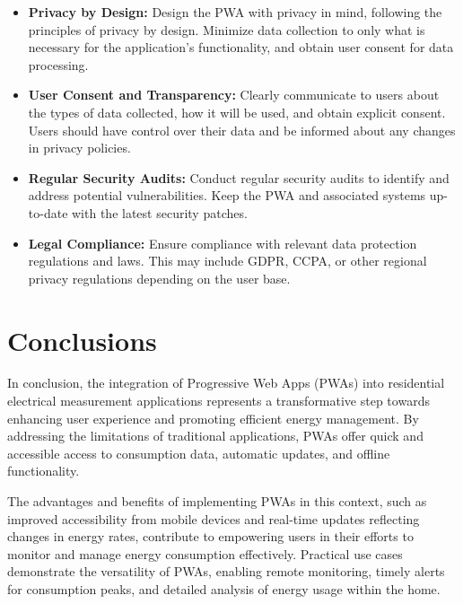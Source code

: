 \documentclass{article}
\begin{document}
\begin{multicols}{2}
\begin{itemize}
    \item \textbf{Privacy by Design:} Design the PWA with privacy in mind, following the principles of privacy by design. Minimize data collection to only what is necessary for the application's functionality, and obtain user consent for data processing.

    \item \textbf{User Consent and Transparency:} Clearly communicate to users about the types of data collected, how it will be used, and obtain explicit consent. Users should have control over their data and be informed about any changes in privacy policies.

    \item \textbf{Regular Security Audits:} Conduct regular security audits to identify and address potential vulnerabilities. Keep the PWA and associated systems up-to-date with the latest security patches.

    \item \textbf{Legal Compliance:} Ensure compliance with relevant data protection regulations and laws. This may include GDPR, CCPA, or other regional privacy regulations depending on the user base.
    
    \vspace{0,5cm}
    \citep{Security}
\end{itemize}

\section*{Conclusions}
In conclusion, the integration of Progressive Web Apps (PWAs) into residential electrical measurement applications represents a transformative step towards enhancing user experience and promoting efficient energy management. By addressing the limitations of traditional applications, PWAs offer quick and accessible access to consumption data, automatic updates, and offline functionality.

\vspace{0,5cm}

The advantages and benefits of implementing PWAs in this context, such as improved accessibility from mobile devices and real-time updates reflecting changes in energy rates, contribute to empowering users in their efforts to monitor and manage energy consumption effectively. Practical use cases demonstrate the versatility of PWAs, enabling remote monitoring, timely alerts for consumption peaks, and detailed analysis of energy usage within the home.


\end{multicols}
\end{document}
